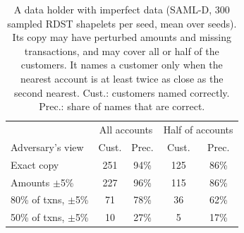 \begin{table}[H]
\caption{A data holder with imperfect data (SAML-D, 300 sampled RDST shapelets per seed, mean over seeds). Its copy may have perturbed amounts and missing transactions, and may cover all or half of the customers. It names a customer only when the nearest account is at least twice as close as the second nearest. Cust.: customers named correctly. Prec.: share of names that are correct.}
\label{tab:real}
\small\setlength{\tabcolsep}{3pt}
\centering
\begin{tabular}{lcccc}
\toprule
& \multicolumn{2}{c}{All accounts} & \multicolumn{2}{c}{Half of accounts} \\
Adversary's view & Cust. & Prec. & Cust. & Prec. \\
\midrule
Exact copy & 251 & 94\% & 125 & 86\% \\
Amounts $\pm$5\% & 227 & 96\% & 115 & 86\% \\
80\% of txns, $\pm$5\% & 71 & 78\% & 36 & 62\% \\
50\% of txns, $\pm$5\% & 10 & 27\% & 5 & 17\% \\
\bottomrule\end{tabular}\end{table}
